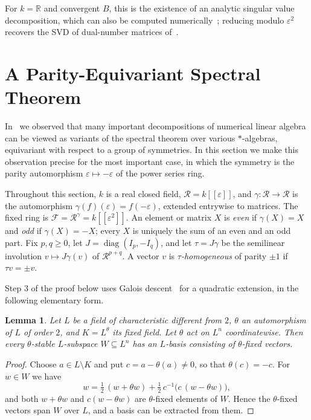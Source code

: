\documentclass[12pt, a4paper]{report}
\theoremstyle{plain}
\newtheorem{lemma}[theorem]{Lemma}
\theoremstyle{definition}
\theoremstyle{remark}
\theoremstyle{plain}
\newcommand{\RR}{\mathbb{R}}
\DeclareMathOperator{\diag}{diag}
\begin{document}
For $k=\RR$ and convergent $B$, this is the existence of an analytic singular value decomposition, which can also be computed numerically~\cite{BunseGerstnerByersMehrmannNichols1991}; reducing modulo $\varepsilon^2$ recovers the SVD of dual-number matrices of~\cite{Gutin2022DualNumbers}.

\section{A Parity-Equivariant Spectral Theorem}
\label{sec:parity}
In~\cite{Gutin2024Clifford} we observed that many important decompositions of numerical linear algebra can be viewed as variants of the spectral theorem over various $*$-algebras, equivariant with respect to a group of symmetries. In this section we make this observation precise for the most important case, in which the symmetry is the parity automorphism $\varepsilon\mapsto-\varepsilon$ of the power series ring.

Throughout this section, $k$ is a real closed field, $\mathcal R=k[[\varepsilon]]$, and $\gamma:\mathcal R\to\mathcal R$ is the automorphism $\gamma(f)(\varepsilon)=f(-\varepsilon)$, extended entrywise to matrices. The fixed ring is $\mathcal F=\mathcal R^\gamma=k[[\varepsilon^2]]$. An element or matrix $X$ is \emph{even} if $\gamma(X)=X$ and \emph{odd} if $\gamma(X)=-X$; every $X$ is uniquely the sum of an even and an odd part. Fix $p,q\geq0$, let $J=\diag(I_p,-I_q)$, and let $\tau=J\gamma$ be the semilinear involution $v\mapsto J\gamma(v)$ of $\mathcal R^{p+q}$. A vector $v$ is \emph{$\tau$-homogeneous} of parity $\pm1$ if $\tau v=\pm v$.

Step 3 of the proof below uses Galois descent~\cite[\S18]{KMRT1998} for a quadratic extension, in the following elementary form.

\begin{lemma}\label{lem:descent}
Let $L$ be a field of characteristic different from $2$, $\theta$ an automorphism of $L$ of order $2$, and $K=L^\theta$ its fixed field. Let $\theta$ act on $L^n$ coordinatewise. Then every $\theta$-stable $L$-subspace $W\subseteq L^n$ has an $L$-basis consisting of $\theta$-fixed vectors.
\end{lemma}
\begin{proof}
Choose $a\in L\setminus K$ and put $c=a-\theta(a)\neq0$, so that $\theta(c)=-c$. For $w\in W$ we have
\[ w=\tfrac12\,(w+\theta w)+\tfrac12\,c^{-1}\bigl(c\,(w-\theta w)\bigr), \]
and both $w+\theta w$ and $c(w-\theta w)$ are $\theta$-fixed elements of $W$. Hence the $\theta$-fixed vectors span $W$ over $L$, and a basis can be extracted from them.
\end{proof}
\end{document}
